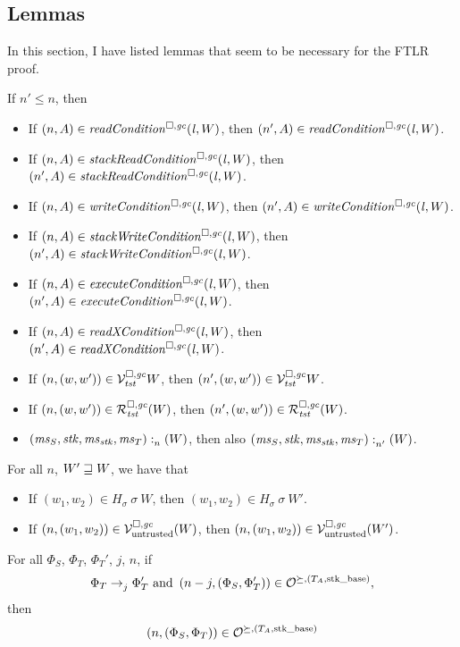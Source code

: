 \subsection{Lemmas}
In this section, I have listed lemmas that seem to be necessary for the FTLR proof.
\begin{lemma}
  \label{lem:non-expansive}
  If $n' \leq n$, then
  \begin{itemize}
  \item If $\npair{A} \in \readCond{\lin,W}$, then $\npair[n']{A} \in \readCond{\lin,W}$.
  \item If $\npair{A} \in \stackReadCond{\lin,W}$, then $\npair[n']{A} \in \stackReadCond{\lin,W}$.
  \item If $\npair{A} \in \writeCond{\lin,W}$, then $\npair[n']{A} \in \writeCond{\lin,W}$.
  \item If $\npair{A} \in \stackWriteCond{\lin,W}$, then $\npair[n']{A} \in \stackWriteCond{\lin,W}$.
  \item If $\npair{A} \in \execCond{\lin,W}$, then $\npair[n']{A} \in \execCond{\lin,W}$.
  \item If $\npair{A} \in \xReadCond{\lin,W}$, then $\npair[n']{A} \in \xReadCond{\lin,W}$.
  \item If $\npair{(w,w')} \in \lrvg{\trust}{W}$, then $\npair[n']{(w,w')} \in \lrvg{\trust}{W}$.
  \item If $\npair{(w,w')} \in \lrrg{\trust}(W)$, then $\npair[n']{(w,w')} \in \lrrg{\trust}(W)$.
  \item $\memSat{(\ms_S,\stk,\ms_\stk,\ms_T)}(W)$, then also $\memSat[n']{(\ms_S,\stk,\ms_\stk,\ms_T)}(W)$.
  \end{itemize}
\end{lemma}

\begin{lemma}
  \label{lem:monotonicity}
  For all $n$, $W' \future W$, we have that
  \begin{itemize}
  \item If $(w_1,w_2) \in H_\sigma~\sigma~W$, then $(w_1,w_2) \in H_\sigma~\sigma~W'$.
  \item If $\npair{(w_1,w_2)} \in \lrv(W)$, then $\npair{(w_1,w_2)} \in
    \lrv(W')$.
\end{itemize}
\end{lemma}

\begin{lemma}
  For all $\Phi_S$, $\Phi_T$, $\Phi_T'$, $j$, $n$, if
\[
  \Phi_T \nstep[j]{} \Phi_T' \text{ and } \npair[n-j]{(\Phi_S,\Phi_T')} \in \lror,
\]
then
\[
  \npair{(\Phi_S,\Phi_T)} \in \lror
\]
\end{lemma}

